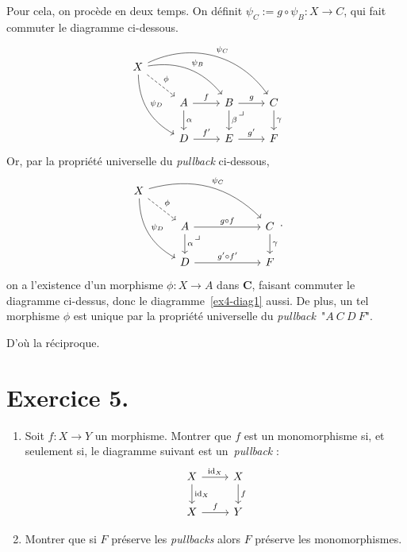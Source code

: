 \documentclass{../../td}
\newcommand\pullback{\arrow[very near start,description,phantom]{dr}{\lrcorner}}
\begin{document}
  Pour cela, on procède en deux temps.
  On définit $\psi_C := g \circ \psi_B : X \to C$, qui fait commuter le diagramme ci-dessous.
  \begin{equation}\label{ex4-diag1}
    \begin{tikzcd}
      X \arrow[dashed]{dr}{\phi} \arrow[bend left]{drr}{\psi_B} \arrow[bend right]{ddr}{\psi_D} \arrow[bend left=40]{drrr}{\psi_C}\\
      &A \arrow{r}{f}\arrow{d}{\alpha} & B\arrow{r}{g}\arrow{d}{\beta}\pullback & C\arrow{d}{\gamma}\\
      &D \arrow{r}{f'} & E\arrow{r}{g'} & F
    \end{tikzcd}
  \end{equation}
  Or, par la propriété universelle du \textit{pullback} ci-dessous, \[
    \begin{tikzcd}
      X \arrow[dashed]{dr}{\phi} \arrow[bend left]{drrr}{\psi_C} \arrow[bend right]{ddr}{\psi_D}\\
      &A \arrow{rr}{g\circ f} \arrow{d}{\alpha}\pullback && C \arrow{d}{\gamma}\\
      &D \arrow{rr}{g'\circ f'} &~& F
    \end{tikzcd}
  .\]
  on a l'existence d'un morphisme $\phi : X \to A$ dans $\mathbf{C}$, faisant commuter le diagramme ci-dessus, donc le diagramme~\ref{ex4-diag1} aussi.
  De plus, un tel morphisme $\phi$ est unique par la propriété universelle du \textit{pullback}~"$A\:C\:D\:F$".

  D'où la réciproque.


  \chapter{Exercice 5.}

  \begin{slshape}
    \color{deepblue}
    \begin{enumerate}
      \item Soit $f : X \to Y$ un morphisme.
        Montrer que $f$ est un monomorphisme si, et seulement si, le diagramme suivant est un~\textit{pullback} :
        \begin{equation}
        \begin{tikzcd}
          X \arrow{r}{\mathrm{id}_X} \arrow{d}{\mathrm{id}_X} & X\arrow{d}{f}\\
          X \arrow{r}{f} & Y
        \end{tikzcd}
        \label{ex5-diag1}
        \end{equation}
      \item Montrer que si $F$ préserve les \textit{pullbacks} alors $F$ préserve les monomorphismes.
    \end{enumerate}
  \end{slshape}
\end{document}
